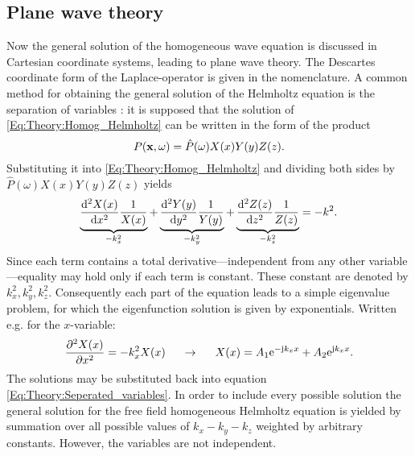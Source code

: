 \subsection{Plane wave theory}
Now the general solution of the homogeneous wave equation is discussed in Cartesian coordinate systems, leading to plane wave theory.
The Descartes coordinate form of the Laplace-operator is given in the nomenclature.
A common method for obtaining the general solution of the Helmholtz equation is the separation of variables \cite{Devaney2012}: 
it is supposed that the solution of \eqref{Eq:Theory:Homog_Helmholtz} can be written in the form of the product
\begin{equation}
P(\mathbf{x},\omega) = \hat{P}(\omega) X(x)Y(y)Z(z).
\label{Eq:Theory:Seperated_variables}
\end{equation}
Substituting it into \eqref{Eq:Theory:Homog_Helmholtz} and dividing both sides by $\hat{P}(\omega) X(x)Y(y)Z(z)$ yields
\begin{equation}
\underbrace{\frac{\mathrm{d}^2 X(x)}{\mathrm{d} x^2}\frac{1}{X(x)}}_{-k_x^2} + 
\underbrace{\frac{\mathrm{d}^2 Y(y)}{\mathrm{d} y^2}\frac{1}{Y(y)}}_{-k_y^2} + 
\underbrace{\frac{\mathrm{d}^2 Z(z)}{\mathrm{d} z^2}\frac{1}{Z(z)}}_{-k_z^2}
= - k^2.
\label{Eq:Theory:Seperated_variables_expanded}
\end{equation}
Since each term contains a total derivative---independent from any other variable---equality may hold only if each term is constant. 
These constant are denoted by $k_x^2, k_y^2, k_z^2$. 
Consequently each part of the equation leads to a simple eigenvalue problem, for which the eigenfunction solution is given by exponentials. 
Written e.g. for the $x$-variable:
\begin{equation}
\frac{\partial^2 X(x)}{\partial x^2} = -k_x^2 X(x) \hspace{5mm} \rightarrow \hspace{5mm} X(x) = A_1 \mathrm{e}^{-\mathrm{j} k_x x} + A_2 \mathrm{e}^{\mathrm{j} k_x x}.
\end{equation}
The solutions may be substituted back into equation \eqref{Eq:Theory:Seperated_variables}. 
In order to include every possible solution the general solution for the free field homogeneous Helmholtz equation is yielded by summation over all possible values of $k_x-k_y-k_z$ weighted by arbitrary constants. 
However, the variables are not independent. 

